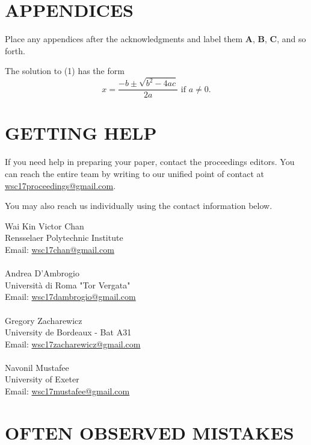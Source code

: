 \documentclass{wscpaperproc}
\theoremstyle{wsc}
\begin{document}
\appendix

\section{APPENDICES} \label{app:quadratic}
Place any appendices after the acknowledgments and label them
\textbf{A}, \textbf{B}, \textbf{C}, and so forth.

The solution to (1) has the form
\begin{equation} \label{eq: quadratic sol}
x = \frac{-b \pm \sqrt{b^2-4ac}}{2a} \mbox{ if } a \ne 0.
\end{equation}

\section{GETTING HELP}
If you need help in preparing your paper, contact the proceedings editors. You can reach the entire team by writing to our unified point of contact at \href{mailto://wsc17proceedings@gmail.com}{wsc17proceedings@gmail.com}.

You may also reach us individually using the contact information below.

\vspace{6pt}

\noindent Wai Kin Victor Chan\\
Rensselaer Polytechnic Institute\\
Email: \href{mailto://wsc17chan@gmail.com}{wsc17chan@gmail.com}\\
\\
Andrea D'Ambrogio\\
Università di Roma "Tor Vergata"\\
Email: \href{mailto://wsc17dambrogio@gmail.com}{wsc17dambrogio@gmail.com}\\
\\
Gregory Zacharewicz\\
University de Bordeaux - Bat A31\\
Email: \href{mailto://wsc17zacharewicz@gmail.com}{wsc17zacharewicz@gmail.com}\\
\\
Navonil Mustafee\\
University of Exeter\\
Email: \href{mailto://wsc17mustafee@gmail.com}{wsc17mustafee@gmail.com}\\

\section{OFTEN OBSERVED MISTAKES}
\end{document}
